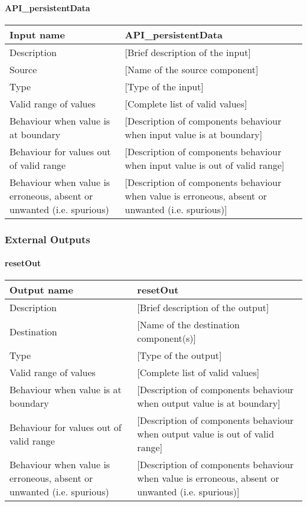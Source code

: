 \paragraph{API\_persistentData}

\begin{longtable}{p{}p{}}
\toprule
Input name				& API\_persistentData \\
\midrule
Description				& [Brief description of the input] \\
\midrule
Source					& [Name of the source component] \\ 
\midrule
Type					& [Type of the input] \\
\midrule
Valid range of values	& [Complete list of valid values] \\
\midrule
Behaviour when value is at boundary	& [Description of components behaviour when input value is at boundary] \\
\midrule
Behaviour for values out of valid range	& [Description of components behaviour when input value is out of valid range] \\
\midrule
Behaviour when value is erroneous, absent or unwanted (i.e. spurious) & [Description of components behaviour when value is erroneous, absent or unwanted (i.e. spurious)] \\
\bottomrule
\end{longtable}



\subsubsection{External Outputs}

\paragraph{resetOut}

\begin{longtable}{p{}p{}}
\toprule
Output name				& resetOut \\
\midrule
Description				& [Brief description of the output] \\
\midrule
Destination				& [Name of the destination component(s)] \\ 
\midrule
Type					& [Type of the output] \\
\midrule
Valid range of values	& [Complete list of valid values] \\
\midrule
Behaviour when value is at boundary	& [Description of components behaviour when output value is at boundary] \\
\midrule
Behaviour for values out of valid range	& [Description of components behaviour when output value is out of valid range] \\
\midrule
Behaviour when value is erroneous, absent or unwanted (i.e. spurious) & [Description of components behaviour when value is erroneous, absent or unwanted (i.e. spurious)] \\
\bottomrule
\end{longtable}


